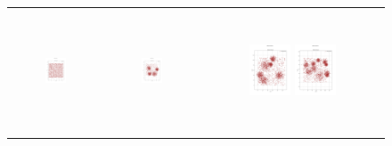 \begin{figure}[p]
\begin{tabular}{ccc}
         \includegraphics[height=36mm,width=0.24\textwidth]{Images/data/31.png}
        & \includegraphics[height=36mm,width=0.24\textwidth]{Images/data/32.png}
        & \includegraphics[height=36mm,width=0.24\textwidth]{Images/data/33.png}
         \includegraphics[height=36mm,width=0.24\textwidth]{Images/data/34.png}\\[-4pt]



\end{tabular}
\end{figure}

